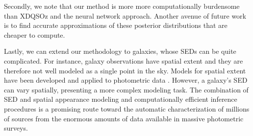 \documentclass{article} %
\begin{document}
Secondly, we note that our method is more more computationally burdensome than XDQSOz and the neural network approach.  Another avenue of future work is to find accurate approximations of these posterior distributions that are cheaper to compute. 

Lastly, we can extend our methodology to galaxies, whose SEDs can be quite complicated.
For instance, galaxy observations have spatial extent and they are therefore not well modeled as a single point in the sky.  
Models for spatial extent have been developed and applied to photometric data \cite{hogg2013replacing, regier2015}.  
However, a galaxy's SED can vary spatially, presenting a more complex modeling task.    
The combination of SED and spatial appearance modeling and computationally efficient inference procedures is a promising route toward the automatic characterization of millions of sources from the enormous amounts of data available in massive photometric surveys.  







\end{document}
